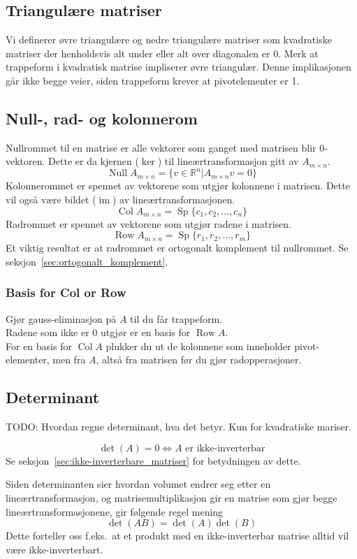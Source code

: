 \documentclass[12pt,a4paper,norsk]{article}
\newcommand{\R}{\mathbb{R}}
\newcommand{\nullmat}{0}
\DeclareMathOperator{\Sp}{Sp} %
\DeclareMathOperator{\Col}{Col} %
\DeclareMathOperator{\Row}{Row}
\DeclareMathOperator{\Null}{Null}
\DeclareMathOperator{\image}{im} %
\begin{document}
\subsection{Triangulære matriser}
Vi definerer øvre triangulære og nedre triangulære matriser som kvadratiske
matriser der henholdsvis alt under eller alt over diagonalen er 0. Merk at
trappeform i kvadratisk matrise impliserer øvre triangulær. Denne implikasjonen
går ikke begge veier, siden trappeform krever at pivotelementer er 1.

\subsection{Null-, rad- og kolonnerom}
Nullrommet til en matrise er alle vektorer som ganget med matrisen blir
0-vektoren. Dette er da kjernen ($\ker$) til lineærtransformasjon gitt av $A_{m \times n}$.
\[\Null A_{m \times n} = \{v \in \R^{n} | A_{m \times n} v = \nullmat\}\]
%
Kolonnerommet er spennet av vektorene som utgjør kolonnene i matrisen. Dette vil
også være bildet ($\image$) av lineærtransformasjonen.
\[\Col A_{m \times n} = \Sp\{c_{1}, c_{2}, \ldots, c_{n}\}\]
%
Radrommet er spennet av vektorene som utgjør radene i matrisen.
\[\Row A_{m \times n} = \Sp\{r_{1}, r_{2}, \ldots, r_{m}\}\]
Et viktig resultat er at radrommet er ortogonalt komplement til nullrommet. Se
seksjon~\ref{sec:ortogonalt_komplement}.

\subsubsection{Basis for Col or Row}
Gjør gauss-eliminasjon på $A$ til du får trappeform.\\
Radene som ikke er 0 utgjør er en basis for $\Row A$.\\
For en basis for $\Col A$ plukker du ut de kolonnene som inneholder
pivot-elementer, men fra $A$, altså fra matrisen før du gjør radopperasjoner.

\subsection{Determinant}
TODO\@: Hvordan regne determinant, hva det betyr. Kun for kvadratiske mariser.

\[\det(A) = 0 \iff A \text{ er ikke-inverterbar}\]
Se seksjon~\ref{sec:ikke-inverterbare_matriser} for betydningen av dette.

Siden determinanten sier hvordan volumet endrer seg etter en
lineærtransformasjon, og matrisemultiplikasjon gir en matrise som gjør begge
lineærtransformasjonene, gir følgende regel mening
\[\det(AB) = \det(A)\det(B)\]
Dette forteller oss f.eks.\ at et produkt med en ikke-inverterbar matrise alltid
vil være ikke-inverterbart.
\end{document}
